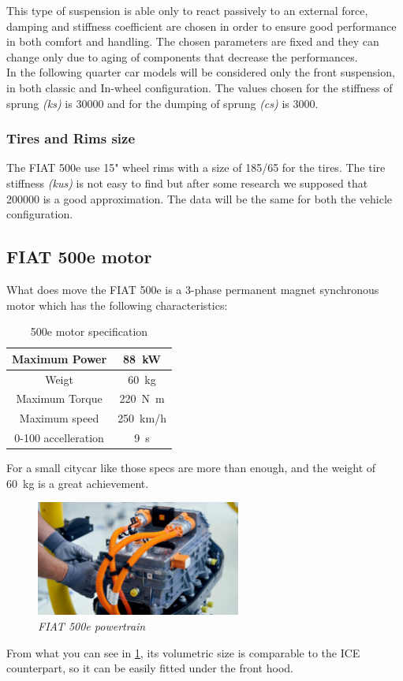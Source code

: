 \documentclass{article}
\numberwithin{equation}{section}
\numberwithin{figure}{section}
\numberwithin{table}{section}
\numberwithin{table}{section}
\begin{document}
This type of suspension is able only to react passively to an external force, damping and stiffness coefficient are chosen in order to ensure good performance in both comfort and handling. The chosen parameters are fixed and they can change only due to aging of components that decrease the performances.\\
\newline
In the following quarter car models will be considered only the front suspension, in both classic and In-wheel configuration. The values chosen for the stiffness of sprung \emph{(ks)} is 30000 and for the dumping of sprung \emph{(cs)} is 3000. 


\subsubsection{Tires and Rims size}
The FIAT 500e use 15" wheel rims with a size of 185/65 for the tires. The tire stiffness \emph{(kus)} is not easy to find but after some research we supposed that 200000 is a good approximation. The data will be the same for both the vehicle configuration.

\subsection{FIAT 500e motor}
What does move the FIAT 500e is a 3-phase permanent magnet synchronous motor which has the following characteristics:
\begin{table}[H]
    \centering
    \begin{tabular}{|c|c|}
        \hline
        Maximum Power& \SI{88}{\kilo\watt}\\
        \hline
        Weigt & \SI{60}{\kilo\gram}\\
        \hline
        Maximum Torque & \SI{220}{\newton\metre}\\
        \hline
        Maximum speed & \SI{250}{\kilo\metre/\hour}\\
        \hline
        0-100 accelleration & \SI{9}{\second}\\
        \hline
    \end{tabular}
    \caption{500e motor specification}
    \label{tab:my_label}
\end{table}
For a small citycar like those specs are more than enough, and the weight of \SI{60}{\kilo\gram} is a great achievement.\\
\begin{figure}[H]
    \centering
    \includegraphics[width=0.6\textwidth]{Pictures/500e_motor.jpg}
    \caption{\emph{FIAT 500e powertrain}}
    \label{fig:500e_motor}
\end{figure}
From what you can see in \cref{fig:500e_motor}, its volumetric size is comparable to the ICE counterpart, so it can be easily fitted under the front hood.
\end{document}
